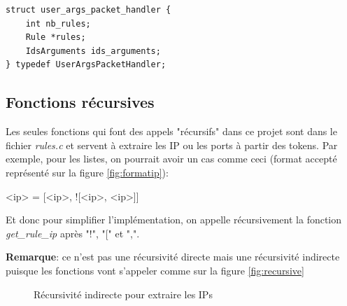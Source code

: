 \documentclass[a4paper]{article}
\begin{document}
\begin{lstlisting}[style=CStyle]
struct user_args_packet_handler {
    int nb_rules;
    Rule *rules;
    IdsArguments ids_arguments;
} typedef UserArgsPacketHandler;
\end{lstlisting}





\subsection{Fonctions récursives}



Les seules fonctions qui font des appels "récursifs" dans ce projet sont dans le fichier \textit{rules.c} et servent à extraire les IP ou les ports à partir des tokens. Par exemple, pour les listes, on pourrait avoir un cas comme ceci (format accepté représenté sur la figure \ref{fig:formatip}):
\begin{center} <ip> = [<ip>, ![<ip>, <ip>]] \end{center}
Et donc pour simplifier l'implémentation, on appelle récursivement la fonction \textit{get\_rule\_ip} après "!", "[" et ",".

\textbf{Remarque}: ce n'est pas une récursivité directe mais une récursivité indirecte puisque les fonctions vont s'appeler comme sur la figure \ref{fig:recursive}

\begin{figure}[H]
    \centering
    \caption{Récursivité indirecte pour extraire les IPs}
\end{figure}
\end{document}
